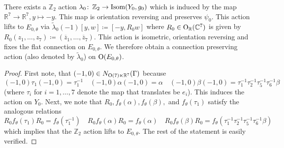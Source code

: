 \documentclass[11pt,a4paper]{scrartcl}
\newcommand{\col}{\colon \thinspace}
\renewcommand{\O}{\textup{O}}
\numberwithin{equation}{section}
\theoremstyle{plain}
\theoremstyle{definition}
\theoremstyle{remark}
\begin{document}
\begin{proposition}\label{prop:Example18_Z2-action}
There exists a $\mathbb{Z}_2$ action $\lambda_0\col \mathbb{Z}_2 \to \textup{Isom}(Y_0,g_0)$ which is induced by the map $\mathbb{R}^7 \to \mathbb{R}^7, y \mapsto -y$. This map is orientation reversing and preserves $\psi_0$. This action lifts to $E_{0,\theta}$ via $\tilde{\lambda}_0(-1) [y,w] \coloneqq [-y, R_0w]$ where $R_0 \in \O_{\mathbb{R}}(\mathbb{C}^7)$ is given by $R_0(z_1,\dots,z_7) \coloneqq (\overline{z}_1,\dots,\overline{z}_7)$. This action is isometric, orientation reversing and fixes the flat connection on $E_{0,\theta}$. We therefore obtain a connection preserving action (also denoted by $\tilde{\lambda}_0$) on $\O(E_{0,\theta})$.
\end{proposition}
\begin{proof}
First note, that $(-1,0) \in N_{\O(7)\ltimes \mathbb{R}^7}(\Gamma)$ because \[(-1,0)\tau_1 (-1,0) = \tau_1^{-1} \quad (-1,0) \alpha (-1,0) = \alpha \quad (-1,0) \beta (-1,0) = \tau_1^{-1}\tau_2^{-1}\tau_5^{-1}\tau_6^{-1} \beta\] (where $\tau_i$ for $i=1,\dots,7$ denote the map that translates be $e_i$). This induces the action on $Y_0$. Next, we note that $R_0, f_\theta(\alpha), f_\theta(\beta),$ and $f_\theta(\tau_1)$ satisfy the analogous relations \[R_0 f_\theta(\tau_1) R_0 = f_\theta(\tau_1^{-1}) \quad R_0 f_\theta(\alpha) R_0 = f_\theta(\alpha) \quad R_0 f_\theta(\beta) R_0 = f_\theta(\tau_1^{-1}\tau_2^{-1}\tau_5^{-1}\tau_6^{-1} \beta) \] which implies that the $\mathbb{Z}_2$ action lifts to $E_{0,\theta}$. The rest of the statement is easily verified.
\end{proof}
\end{document}
